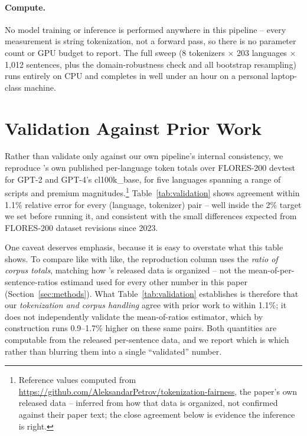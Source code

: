 \documentclass[11pt]{article}
\begin{document}
\paragraph{Compute.} No model training or inference is performed anywhere
in this pipeline -- every measurement is string tokenization, not a forward
pass, so there is no parameter count or GPU budget to report. The full
sweep (8 tokenizers $\times$ 203 languages $\times$ 1{,}012 sentences, plus
the domain-robustness check and all bootstrap resampling) runs entirely on
CPU and completes in well under an hour on a personal laptop-class machine.

\section{Validation Against Prior Work}
\label{sec:validation}

Rather than validate only against our own pipeline's internal consistency,
we reproduce \citeauthor{petrov2023}'s own published per-language token
totals over FLORES-200 devtest for GPT-2 and GPT-4's cl100k\_base, for five
languages spanning a range of scripts and premium magnitudes.\footnote{Reference
values computed from \url{https://github.com/AleksandarPetrov/tokenization-fairness},
the paper's own released data -- inferred from how that data is organized,
not confirmed against their paper text; the close agreement below is
evidence the inference is right.} Table~\ref{tab:validation} shows agreement
within 1.1\% relative error for every (language, tokenizer) pair -- well
inside the 2\% target we set before running it, and consistent with the
small differences expected from FLORES-200 dataset revisions since 2023.

One caveat deserves emphasis, because it is easy to overstate what this
table shows. To compare like with like, the reproduction column uses the
\emph{ratio of corpus totals}, matching how \citeauthor{petrov2023}'s
released data is organized -- not the mean-of-per-sentence-ratios estimand
used for every other number in this paper (Section~\ref{sec:methods}). What
Table~\ref{tab:validation} establishes is therefore that our
\emph{tokenization and corpus handling} agree with prior work to within
1.1\%; it does not independently validate the mean-of-ratios estimator,
which by construction runs 0.9--1.7\% higher on these same pairs. Both
quantities are computable from the released per-sentence data, and we report
which is which rather than blurring them into a single ``validated''
number.
\end{document}
